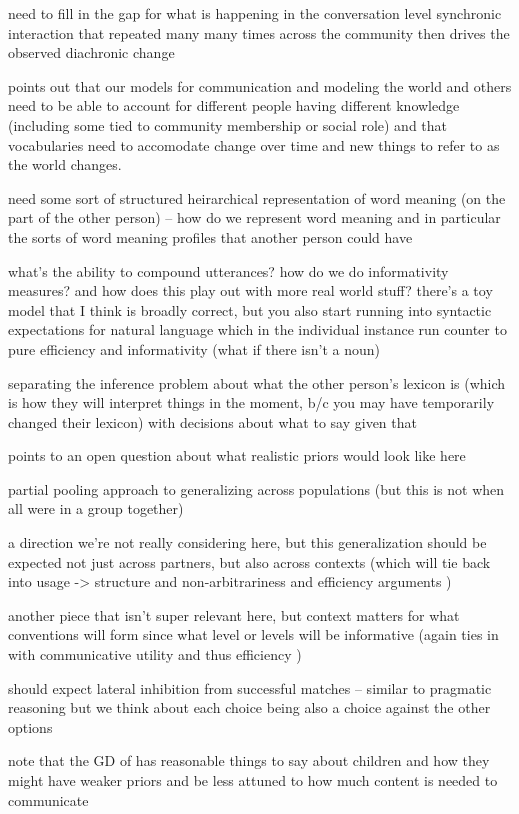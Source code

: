 \documentclass[]{article}
\begin{document}
need to fill in the gap for what is happening in the conversation level synchronic interaction that repeated many many times across the community then drives the observed diachronic change 

\cite{hawkins2021} points out that our models for communication and modeling the world and others need to be able to account for different people having different knowledge (including some tied to community membership or social role) and that vocabularies need to accomodate change over time and new things to refer to as the world changes. 


need some sort of structured heirarchical representation of word meaning (on the part of the other person) -- how do we represent word meaning and in particular the sorts of word meaning profiles that another person could have 

what's the ability to compound utterances? how do we do informativity measures? and how does this play out with more real world stuff? there's a toy model that I think is broadly correct, but you also start running into syntactic expectations for natural language which in the individual instance run counter to pure efficiency and informativity (what if there isn't a noun) 

\cite{hawkins2021} separating the inference problem about what the other person's lexicon is (which is how they will interpret things in the moment, b/c you may have temporarily changed their lexicon) with decisions about what to say given that 

points to an open question about what realistic priors would look like here

partial pooling approach to generalizing across populations (but this is not when all were in a group together) 

a direction we're not really considering here, but this generalization should be expected not just across partners, but also across contexts (which will tie back into usage -> structure and non-arbitrariness and efficiency arguments )

another piece that isn't super relevant here, but context matters for what conventions will form since what level or levels will be informative (again ties in with communicative utility and thus efficiency )

should expect lateral inhibition from successful matches -- similar to pragmatic reasoning but we think about each choice being also a choice against the other options 

note that the GD of \cite{hawkins2021} has reasonable things to say about children and how they might have weaker priors and be less attuned to how much content is needed to communicate 
\end{document}
